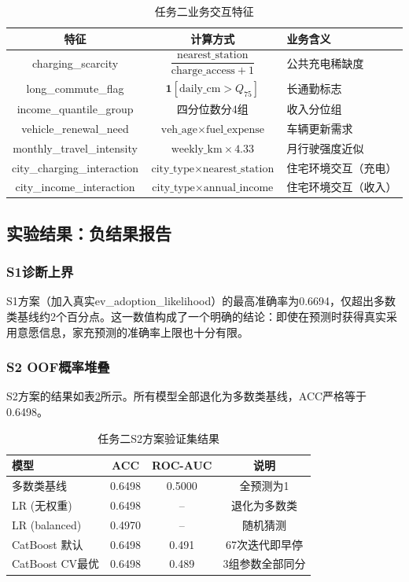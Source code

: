 \begin{table}[H]
\centering
\caption{任务二业务交互特征}
\label{tab:t2_features}
\begin{tabular}{ccp{4cm}}
\toprule
\textbf{特征} & \textbf{计算方式} & \textbf{业务含义} \\
\midrule
charging\_scarcity & $\dfrac{\text{nearest\_station}}{\text{charge\_access} + 1}$ & 公共充电稀缺度 \\
long\_commute\_flag & $\mathbf{1}[\text{daily\_cm} > Q_{75}]$ & 长通勤标志 \\
income\_quantile\_group & 四分位数分4组 & 收入分位组 \\
vehicle\_renewal\_need & $\text{veh\_age} \times \text{fuel\_expense}$ & 车辆更新需求 \\
monthly\_travel\_intensity & $\text{weekly\_km} \times 4.33$ & 月行驶强度近似 \\
city\_charging\_interaction & $\text{city\_type} \times \text{nearest\_station}$ & 住宅环境交互（充电） \\
city\_income\_interaction & $\text{city\_type} \times \text{annual\_income}$ & 住宅环境交互（收入） \\
\bottomrule
\end{tabular}
\end{table}

\subsection{实验结果：负结果报告}

\subsubsection{S1诊断上界}

S1方案（加入真实ev\_adoption\_likelihood）的最高准确率为0.6694，仅超出多数类基线约2个百分点。这一数值构成了一个明确的结论：即使在预测时获得真实采用意愿信息，家充预测的准确率上限也十分有限。

\subsubsection{S2 OOF概率堆叠}

S2方案的结果如表\ref{tab:t2_results}所示。所有模型全部退化为多数类基线，ACC严格等于0.6498。

\begin{table}[H]
\centering
\caption{任务二S2方案验证集结果}
\label{tab:t2_results}
\begin{tabular}{lccc}
\toprule
\textbf{模型} & \textbf{ACC} & \textbf{ROC-AUC} & \textbf{说明} \\
\midrule
多数类基线 & 0.6498 & 0.5000 & 全预测为1 \\
LR (无权重) & 0.6498 & -- & 退化为多数类 \\
LR (balanced) & 0.4970 & -- & 随机猜测 \\
CatBoost 默认 & 0.6498 & 0.491 & 67次迭代即早停 \\
CatBoost CV最优 & 0.6498 & 0.489 & 3组参数全部同分 \\
\bottomrule
\end{tabular}
\end{table}

